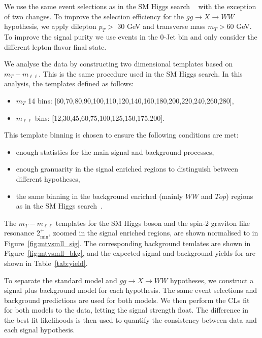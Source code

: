 We use the same event selections as in the SM Higgs search 
~\cite{HWWHCP2012} with the exception of two changes.
To improve the selection efficiency for the $gg\to X\to WW$ hypothesis,
we apply dilepton $p_T>$ 30 GeV and transverse mass $m_T>$60 GeV.
To improve the signal purity we use events in the 0-Jet bin 
and only consider the different lepton flavor final state.

We analyse the data by constructing two dimensional templates based on $m_T-m_{\ell\ell}$.
This is the same procedure used in the SM Higgs search.
In this analysis, the templates defined as follows:

\begin{itemize}
\item $m_T$ 14 bins: [60,70,80,90,100,110,120,140,160,180,200,220,240,260,280],
\item $m_{\ell\ell}$ bins: [12,30,45,60,75,100,125,150,175,200].
\end{itemize}

This template binning is chosen to ensure the following conditions are met:

\begin{itemize}
    \item enough statistics for the main signal and background processes, 
    \item enough granuarity in the signal enriched regions to distinguish between 
different hypotheses, 
    \item the same binning in the background enriched (mainly $WW$ and $Top$) regions 
as in the SM Higgs search~\cite{HWWHCP2012}. 
\end{itemize}

The $m_T-m_{\ell\ell}$ templates for the SM Higgs boson and 
the spin-2 graviton like resonance $2_\text{min}^+$, zoomed in the 
signal enriched regions, are shown normalised to \intlumiEightTeV 
in Figure~\ref{fig:mtvsmll_sig}.
The corresponding background temlates are shown in 
Figure~\ref{fig:mtvsmll_bkg}, and the expected signal and
background yields for \intlumiEightTeV are shown in Table~\ref{tab:yield}.

To separate the standard model and $gg\to X\to WW$ hypotheses,
we construct a signal plus background model for each hypothesis.
The same event selections and background predictions are used for both models.
We then perform the CLs fit for both models to the data, letting the 
signal strength float.
The difference in the best fit likelihoods is then used 
to quantify the consistency between data and each signal hypothesis. 

